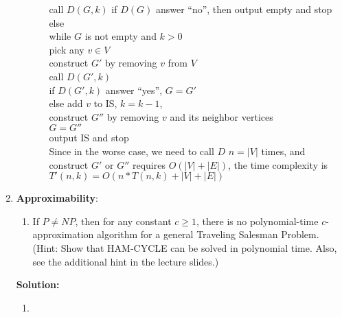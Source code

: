 \documentclass{article}%
\begin{document}
\begin{enumerate}
\begin{enumerate}
\begin{enumerate}
	call $D(G,k)$
	if $D(G)$ answer ``no'', then output empty and stop
	else \\
	\hspace*{0.1in} while $G$ is not empty and $k > 0$ \\
	\hspace*{0.2in} pick any $v \in V$\\
	\hspace*{0.2in} construct $G'$ by removing $v$ from $V$\\
	\hspace*{0.2in} call $D(G',k)$\\
	\hspace*{0.2in} if $D(G',k)$ answer ``yes'', $G=G'$\\
	\hspace*{0.2in} else add $v$ to IS, $k=k-1$, \\
	\hspace*{0.5in} construct $G''$ by removing $v$ and its neighbor vertices \\
	\hspace*{0.5in} $G=G''$ \\
	\hspace*{0.1in} output IS and stop\\
	
	Since in the worse case, we need to call $D$ $n=|V|$ times, and construct $G'$ or $G''$ requires $O(|V|+|E|)$, the time complexity is 
	$T'(n,k)=O(n*T(n,k)+|V|+|E|)$
	
\end{enumerate}
	
	\end{enumerate}

	
	\item \textbf{Approximability}: 
	\begin{enumerate}
	\item  If $P \neq NP$, then for any constant $c \geq 1$, there is no polynomial-time $c$-approximation algorithm for a general Traveling Salesman Problem. (Hint: Show that HAM-CYCLE can be solved in polynomial time. Also, see the additional hint in the lecture slides.)
	
		\end{enumerate}
		
		\textbf{Solution:}
\begin{enumerate}
	\item 
	

\end{enumerate}
\end{enumerate}
\end{document}
